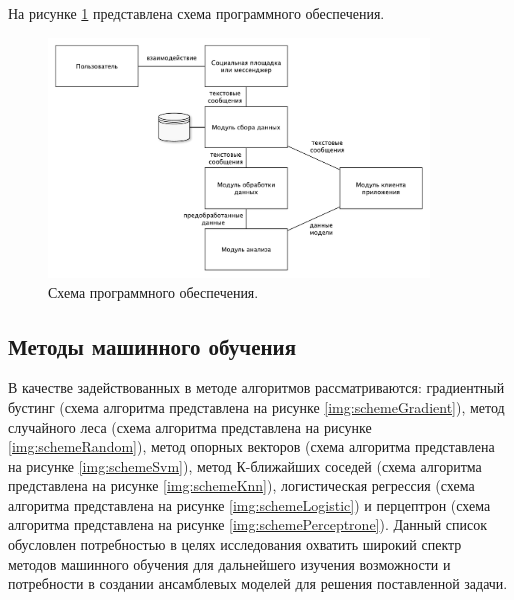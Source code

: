 На рисунке \ref{img:softScheme} представлена схема программного обеспечения.

\begin{figure}[H]
	\centering
	\includegraphics[width=0.9\textwidth]{inc/softScheme.pdf}
	\caption{ Схема программного обеспечения. }
	\label{img:softScheme}
\end{figure}


\subsection{Методы машинного обучения}

В качестве задействованных в методе алгоритмов рассматриваются: градиентный бустинг (схема алгоритма представлена на рисунке \ref{img:schemeGradient}), метод случайного леса (схема алгоритма представлена на рисунке \ref{img:schemeRandom}), метод опорных векторов (схема алгоритма представлена на рисунке \ref{img:schemeSvm}), метод К-ближайших соседей (схема алгоритма представлена на рисунке \ref{img:schemeKnn}), логистическая регрессия (схема алгоритма представлена на рисунке \ref{img:schemeLogistic}) и перцептрон (схема алгоритма представлена на рисунке \ref{img:schemePerceptrone}). Данный список обусловлен потребностью в целях исследования охватить широкий спектр методов машинного обучения для дальнейшего изучения возможности и потребности в создании ансамблевых моделей для решения поставленной задачи.

